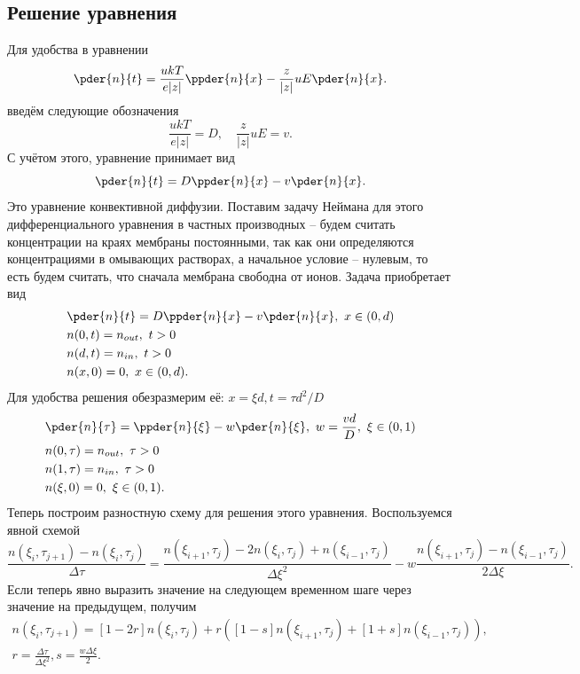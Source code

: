 \documentclass{hedwork}
\begin{document}
\subsection{Решение уравнения}
    Для удобства в уравнении
    \[
        \pder{n}{t} = \frac{ukT}{e|z|}\ppder{n}{x} -
            \frac{z}{|z|}uE\pder{n}{x}.
    \]
    введём следующие обозначения
    \[
        \frac{ukT}{e|z|} = D,\quad \frac{z}{|z|}uE = v.
    \]
    С учётом этого, уравнение принимает вид
    \[
        \pder{n}{t} = D\ppder{n}{x} - v\pder{n}{x}.
    \]
    Это уравнение конвективной диффузии. Поставим задачу Неймана для
    этого дифференциального уравнения в частных производных -- будем
    считать концентрации на краях мембраны постоянными, так как они
    определяются концентрациями в омывающих растворах, а начальное
    условие -- нулевым, то есть будем считать, что сначала мембрана
    свободна от ионов. Задача приобретает вид
    \begin{align*}
        & \pder{n}{t} = D\ppder{n}{x} - v\pder{n}{x},\ x\in(0,d)\\
        & n(0, t) = n_{out},\ t>0 \\
        & n(d, t) = n_{in},\ t>0 \\
        & n(x, 0) = 0,\ x\in(0,d).
    \end{align*}
    Для удобства решения обезразмерим её:
    \( x = \xi d, t = \tau d^2 / D \)
    \begin{align*}
        & \pder{n}{\tau} = \ppder{n}{\xi} -
            w\pder{n}{\xi},\ w = \frac{vd}{D},\ \xi\in(0,1) \\
        & n(0, \tau) = n_{out},\ \tau>0 \\
        & n(1, \tau) = n_{in},\ \tau>0 \\
        & n(\xi, 0) = 0,\ \xi\in(0,1).
    \end{align*}
    Теперь построим разностную схему для решения этого уравнения.
    Воспользуемся явной схемой
    \[
        \frac{n(\xi_i,\tau_{j+1}) - n(\xi_i, \tau_j)}{\Delta\tau} =
        \frac{n(\xi_{i+1},\tau_j) - 2n(\xi_i, \tau_j) +
        n(\xi_{i-1},\tau_j)}{\Delta\xi^2} -
        w\frac{n(\xi_{i+1},\tau_j) - n(\xi_{i-1}, \tau_j)}{2\Delta\xi}.
    \]
    Если теперь явно выразить значение на следующем временном шаге через
    значение на предыдущем, получим
    \begin{gather*}
        n(\xi_i,\tau_{j+1}) =
        [1-2r]n(\xi_i, \tau_j) +
        r\left(
            [1 - s]n(\xi_{i+1},\tau_j) + [1 + s]n(\xi_{i-1},\tau_j)
        \right),\\
        r = \frac{\Delta\tau}{\Delta\xi^2}, s = \frac{w\Delta\xi}{2}.
    \end{gather*}
\end{document}

